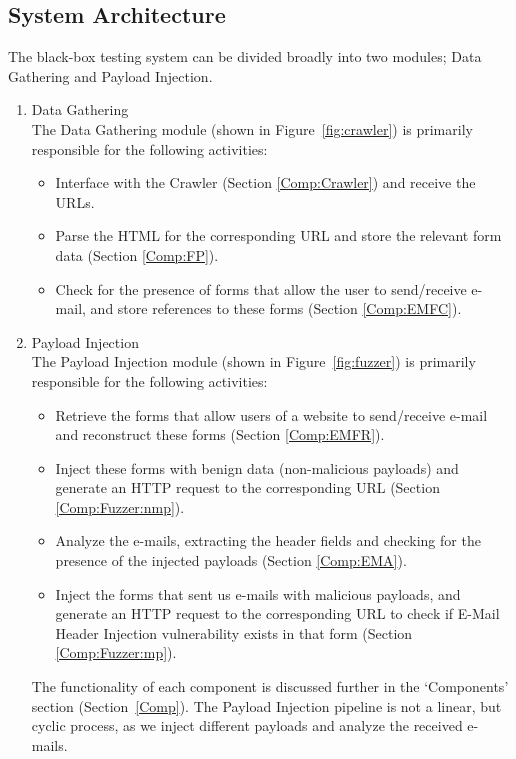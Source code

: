 \subsection{System Architecture}
\label{sys:arch}
The black-box testing system can be divided broadly into two modules; Data Gathering and Payload Injection.
\begin{enumerate}
	\item Data Gathering\\
	The Data Gathering module (shown in Figure~\ref{fig:crawler}) is primarily responsible for the following activities:
	\begin{itemize}
		\item Interface with the Crawler (Section \ref{Comp:Crawler}) and receive the URLs.
		\item Parse the HTML for the corresponding URL and store the relevant form data (Section \ref{Comp:FP}).
		\item Check for the presence of forms that allow the user to send/receive e-mail, and store references to these forms (Section \ref{Comp:EMFC}).
	\end{itemize} 
	\item Payload Injection\\
	The Payload Injection module (shown in Figure~\ref{fig:fuzzer}) is primarily responsible for the following activities:
	\begin{itemize}
		\item Retrieve the forms that allow users of a website to send/receive e-mail and reconstruct these forms (Section \ref{Comp:EMFR}).
		\item Inject these forms with benign data (non-malicious payloads) and generate an HTTP request to the corresponding URL (Section \ref{Comp:Fuzzer:nmp}).
		\item Analyze the e-mails, extracting the header fields and checking for the presence of the injected payloads (Section \ref{Comp:EMA}).
		\item Inject the forms that sent us e-mails with malicious payloads, and generate an HTTP request to the corresponding URL to check if E-Mail Header Injection vulnerability exists in that form (Section \ref{Comp:Fuzzer:mp}).
	\end{itemize} 
	The functionality of each component is discussed further in the `Components' section (Section~\ref{Comp}). The Payload Injection pipeline is not a linear, but cyclic process, as we inject different payloads and analyze the received e-mails.
\end{enumerate}